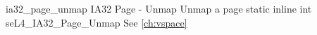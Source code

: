 %
%
%
%

\apidoc
{ia32_page_unmap}
{IA32 Page - Unmap}
{Unmap a page}
{static inline int seL4\_IA32\_Page\_Unmap}
{
}
{\errorenumdesc}
{See \autoref{ch:vspace}}
